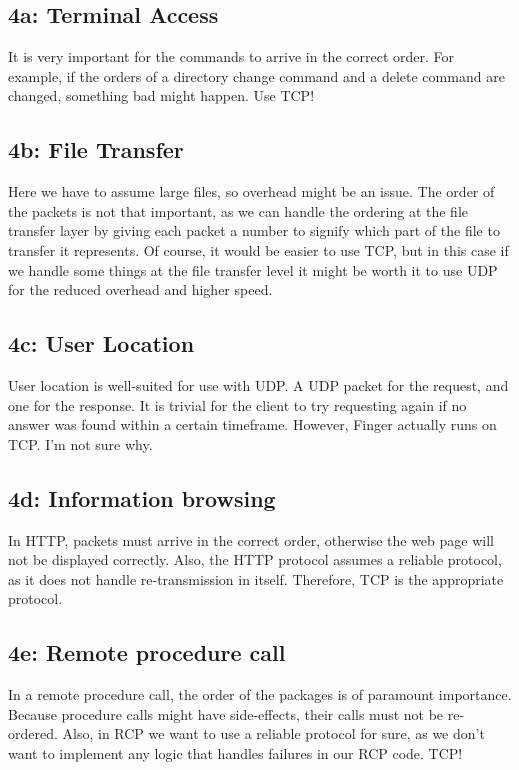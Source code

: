 \documentclass[a4paper]{article}
\begin{document}
\subsection{4a: Terminal Access}

It is very important for the commands to arrive in the correct order. For example, if the orders of a directory change command and a delete command are changed, something bad might happen. Use TCP!

\subsection{4b: File Transfer}

Here we have to assume large files, so overhead might be an issue. The order of the packets is not that important, as we can handle the ordering at the file transfer layer by giving each packet a number to signify which part of the file to transfer it represents. Of course, it would be easier to use TCP, but in this case if we handle some things at the file transfer level it might be worth it to use UDP for the reduced overhead and higher speed.

\subsection{4c: User Location}

User location is well-suited for use with UDP. A UDP packet for the request, and one for the response. It is trivial for the client to try requesting again if no answer was found within a certain timeframe. 
However, Finger actually runs on TCP. I'm not sure why.

\subsection{4d: Information browsing}

In HTTP, packets must arrive in the correct order, otherwise the web page will not be displayed correctly. Also, the HTTP protocol assumes a reliable protocol, as it does not handle re-transmission in itself. Therefore, TCP is the appropriate protocol.

\subsection{4e: Remote procedure call}

In a remote procedure call, the order of the packages is of paramount importance. Because procedure calls might have side-effects, their calls must not be re-ordered. Also, in RCP we want to use a reliable protocol for sure, as we don't want to implement any logic that handles failures in our RCP code. TCP!
\end{document}
